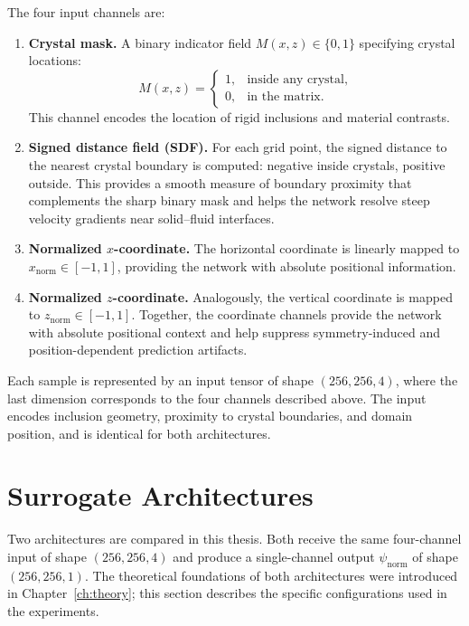 The four input channels are:

\begin{enumerate}
    \item \textbf{Crystal mask.}
    A binary indicator field $M(x,z)\in\{0,1\}$ specifying crystal locations:
    \[
        M(x,z)=
        \begin{cases}
            1, & \text{inside any crystal},\\
            0, & \text{in the matrix}.
        \end{cases}
    \]
    This channel encodes the location of rigid inclusions and material contrasts.

    \item \textbf{Signed distance field (SDF).}
    For each grid point, the signed distance to the nearest crystal boundary is computed: negative inside crystals, positive outside. This provides a smooth measure of boundary proximity that complements the sharp binary mask and helps the network resolve steep velocity gradients near solid--fluid interfaces.

    \item \textbf{Normalized $x$-coordinate.}
    The horizontal coordinate is linearly mapped to $x_{\mathrm{norm}}\in[-1,1]$, providing the network with absolute positional information.

    \item \textbf{Normalized $z$-coordinate.}
    Analogously, the vertical coordinate is mapped to $z_{\mathrm{norm}}\in[-1,1]$. Together, the coordinate channels provide the network with absolute positional context and help suppress symmetry-induced and position-dependent prediction artifacts.
\end{enumerate}

Each sample is represented by an input tensor of shape $(256,256,4)$, where the last dimension corresponds to the four channels described above. The input encodes inclusion geometry, proximity to crystal boundaries, and domain position, and is identical for both architectures.

\section{Surrogate Architectures}
\label{sec:architectures}

Two architectures are compared in this thesis. Both receive the same four-channel input of shape $(256,256,4)$ and produce a single-channel output $\psi_{\mathrm{norm}}$ of shape $(256,256,1)$. The theoretical foundations
of both architectures were introduced in Chapter~\ref{ch:theory}; this section describes the specific configurations used in the experiments.

